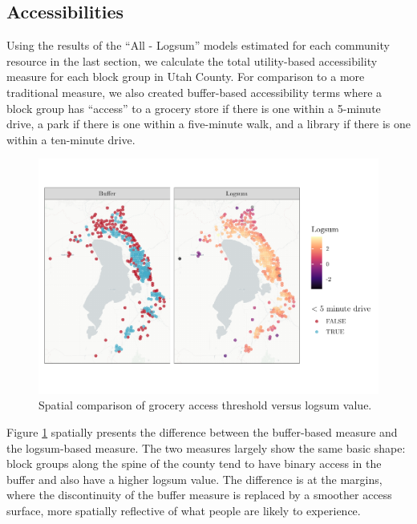 \documentclass[ijerph,article,submit,moreauthors,pdftex]{mdpi}
\begin{document}
\hypertarget{accessibilities}{%
\subsection{Accessibilities}\label{accessibilities}}

Using the results of the ``All - Logsum'' models estimated for each community resource
in the last section, we calculate the total utility-based accessibility measure
for each block group in Utah County. For comparison to a more traditional measure,
we also created buffer-based accessibility terms where a block group has
``access'' to a grocery store if there is one within a 5-minute drive, a
park if there is one within a five-minute walk, and a library if there is one within
a ten-minute drive.

\begin{figure}
\centering
\includegraphics{Community_Resources_files/figure-latex/access-map-1.pdf}
\caption{\label{fig:access-map}Spatial comparison of grocery access threshold versus logsum value.}
\end{figure}

Figure \ref{fig:access-map} spatially presents the difference between the
buffer-based measure and the logsum-based measure. The two measures largely
show the same basic shape: block groups along the spine of the county tend
to have binary access in the buffer and also have a higher logsum value. The
difference is at the margins, where the discontinuity of the buffer measure
is replaced by a smoother access surface, more spatially reflective of what
people are likely to experience.
\end{document}
